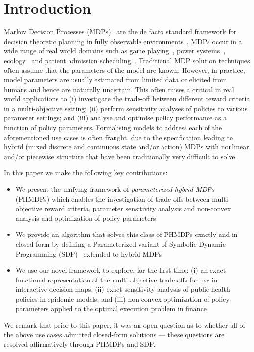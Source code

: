 \section{Introduction}
\label{sec:introduction}

Markov Decision Processes (MDPs)~\parencite{Howard_MIT_1960} are the
de facto standard framework for decision theoretic planning in fully
observable environments~\parencite{Boutilier_JAIR_1999}. MDPs occur in
a wide range of real world domains such as game
playing~\parencite{Szita_RL_2012}, power
systems~\parencite{Reddy_IJCAI_2011},
ecology~\parencite{Williams_EM_2009} and patient admission
scheduling~\parencite{Zhu_AIM_2014}. Traditional MDP solution
techniques often assume that the parameters of the model are
known. However, in practice, model parameters are usually estimated from limited data or
elicited from humans and hence are naturally uncertain.  This often raises a critical in real
world applications to (i) investigate the trade-off between
different reward criteria in a multi-objective setting; (ii) 
perform sensitivity analyses of policies to various parameter
settings; and (iii) analyse and optimise policy performance as a
function of policy parameters.  Formalising models to address each of
the aforementioned use cases is often fraught, due to the
specification leading to hybrid (mixed discrete and continuous
state and/or action) MDPs with nonlinear and/or piecewise structure
that have been traditionally very difficult to solve.

In this paper we make the following key contributions:
\begin{itemize}
    \item We present the unifying framework of {\it parameterized hybrid
      MDPs} (PHMDPs) which enables the investigation of trade-offs between
      multi-objective reward criteria, parameter sensitivity analysis and
      non-convex analysis and optimization of policy parameters
    \item We provide an algorithm that solves this class of
      PHMDPs exactly and in closed-form by defining a Parameterized variant of 
      Symbolic Dynamic Programming (SDP)~\parencite{Boutilier_IJCAI_2001}
      extended to hybrid MDPs~\parencite{Sanner_UAI_2011}
    \item We use our novel framework to explore, for the first time:
      (i) an exact functional representation of the multi-objective
      trade-offs for use in interactive decision maps; (ii) exact
      sensitivity analysis of public health policies in epidemic
      models; and (iii) non-convex optimization of policy parameters
      applied to the optimal execution problem in finance
\end{itemize}
We remark that prior to this paper, it was an open question as to whether
all of the above use cases admitted closed-form solutions --- these questions
are resolved affirmatively through PHMDPs and SDP.

